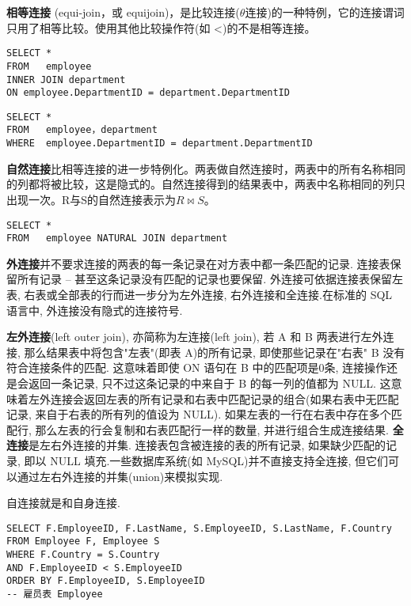 \textbf{相等连接} (equi-join，或 equijoin)，是比较连接({$\theta$连接})的一种特例，它的连接谓词只用了相等比较。使用其他比较操作符(如 <)的不是相等连接。
\begin{verbatim}
SELECT *
FROM   employee 
INNER JOIN department 
ON employee.DepartmentID = department.DepartmentID
\end{verbatim}

\begin{verbatim}
SELECT *  
FROM   employee，department 
WHERE  employee.DepartmentID = department.DepartmentID
\end{verbatim}

 \textbf{自然连接}比相等连接的进一步特例化。两表做自然连接时，两表中的所有名称相同的列都将被比较，这是隐式的。自然连接得到的结果表中，两表中名称相同的列只出现一次。R与S的自然连接表示为$R \Join S$。

\begin{verbatim}
SELECT *
FROM   employee NATURAL JOIN department
\end{verbatim}

\textbf{外连接}并不要求连接的两表的每一条记录在对方表中都一条匹配的记录. 连接表保留所有记录 -- 甚至这条记录没有匹配的记录也要保留. 外连接可依据连接表保留左表, 右表或全部表的行而进一步分为左外连接, 右外连接和全连接.在标准的 SQL 语言中, 外连接没有隐式的连接符号.

\textbf{左外连接}(left outer join), 亦简称为左连接(left join), 若 A 和 B 两表进行左外连接, 那么结果表中将包含"左表"(即表 A)的所有记录, 即使那些记录在"右表" B 没有符合连接条件的匹配. 这意味着即使 ON 语句在 B 中的匹配项是0条, 连接操作还是会返回一条记录, 只不过这条记录的中来自于 B 的每一列的值都为 NULL. 这意味着左外连接会返回左表的所有记录和右表中匹配记录的组合(如果右表中无匹配记录, 来自于右表的所有列的值设为 NULL). 如果左表的一行在右表中存在多个匹配行, 那么左表的行会复制和右表匹配行一样的数量, 并进行组合生成连接结果.
\textbf{全连接}是左右外连接的并集. 连接表包含被连接的表的所有记录, 如果缺少匹配的记录, 即以 NULL 填充.一些数据库系统(如 MySQL)并不直接支持全连接, 但它们可以通过左右外连接的并集(union)来模拟实现.

自连接就是和自身连接.

\begin{verbatim}
SELECT F.EmployeeID, F.LastName, S.EmployeeID, S.LastName, F.Country
FROM Employee F, Employee S
WHERE F.Country = S.Country
AND F.EmployeeID < S.EmployeeID
ORDER BY F.EmployeeID, S.EmployeeID
-- 雇员表 Employee
\end{verbatim}


















